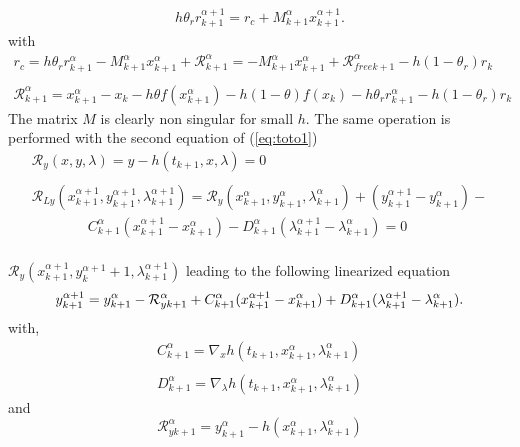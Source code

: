 \begin{equation}
   \begin{array}{l}
 h \theta _r  r^{\alpha+1}_{k+1} = r_c + M^{\alpha}_{k+1} x^{\alpha+1}_{k+1}
 .\label{eq:NL11} 
 \end{array}
\end{equation}
with 
\begin{equation}
   \begin{array}{l}
r_c = h \theta _r r^{\alpha}_{k+1} - M^{\alpha}_{k+1} x^{\alpha}_{k+1} + \mathcal R
^{\alpha}_{k+1}=- M^{\alpha}_{k+1} x^{\alpha}_{k+1} + \mathcal R_{free k+1} ^{\alpha} - h(1-\theta_r)r_k\\ \\
\mathcal R ^{\alpha}_{k+1}= x^{\alpha}_{k+1} - x_k -h \theta f(x^{\alpha}_{k+1})-h(1-\theta)f(x_k)
- h \theta _r r^{\alpha}_{k+1} -h(1- \theta _r)r_k

 \end{array}
   \end{equation}
The matrix $M$ is clearly non singular for small $h$.
The same operation is performed with the second equation of (\ref{eq:toto1})
\begin{equation}
   \label{eq:NL9}
   \begin{array}{l}
      \mathcal R_y(x,y,\lambda)=y-h(t_{k+1},x,\lambda) =0\\ \\
      \mathcal R_{Ly}(x^{\alpha+1}_{k+1},y^{\alpha+1}_{k+1},\lambda^{\alpha+1}_{k+1}) = \mathcal
      R_{y}(x^{\alpha}_{k+1},y^{\alpha}_{k+1},\lambda^{\alpha}_{k+1}) +
      (y^{\alpha+1}_{k+1}-y^{\alpha}_{k+1})- \\ \qquad \qquad
      C^{\alpha}_{k+1}(x^{\alpha+1}_{k+1}-x^{\alpha}_{k+1}) - D^{\alpha}_{k+1}(\lambda^{\alpha+1}_{k+1}-\lambda^{\alpha}_{k+1})=0\\
      
 \end{array}
\end{equation}

$\mathcal R_y(x^{\alpha+1}_{k+1},y^{\alpha+1}_k+1,\lambda^{\alpha+1}_{k+1})$ leading to the following linearized equation
\begin{equation}
  y^{\alpha+1}_{k+1} =  y^{\alpha}_{k+1}
  -\mathcal R^{\alpha}_{yk+1}+ \\
  C^{\alpha}_{k+1}(x^{\alpha+1}_{k+1}-x^{\alpha}_{k+1}) +
  D^{\alpha}_{k+1}(\lambda^{\alpha+1}_{k+1}-\lambda^{\alpha}_{k+1}). \label{eq:NL11y}
\end{equation}
with,
\begin{equation}
     \begin{array}{l}
  C^{\alpha}_{k+1} = \nabla_xh(t_{k+1}, x^{\alpha}_{k+1},\lambda^{\alpha}_{k+1} ) \\ \\
  D^{\alpha}_{k+1} = \nabla_{\lambda}h(t_{k+1}, x^{\alpha}_{k+1},\lambda^{\alpha}_{k+1})
 \end{array}
\end{equation}
and
\begin{equation}
\mathcal R^{\alpha}_{yk+1} = y^{\alpha}_{k+1} - h(x^{\alpha}_{k+1},\lambda^{\alpha}_{k+1})
 \end{equation}

